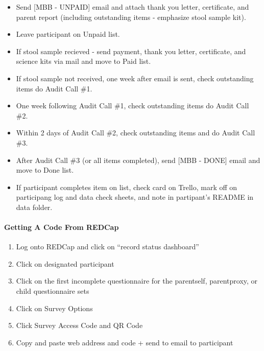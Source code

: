 \documentclass[]{book}
\providecommand{\tightlist}{%
  \setlength{\itemsep}{0pt}\setlength{\parskip}{0pt}}
\let\oldparagraph\paragraph
\renewcommand{\paragraph}[1]{\oldparagraph{#1}\mbox{}}
\begin{document}
\begin{itemize}
\tightlist
\item
  Send {[}MBB - UNPAID{]} email and attach thank you letter, certificate, and parent report (including outstanding items - emphasize stool sample kit).
\item
  Leave participant on Unpaid list.
\item
  If stool sample recieved - send payment, thank you letter, certificate, and science kits via mail and move to Paid list.
\item
  If stool sample not received, one week after email is sent, check outstanding items do Audit Call \#1.
\item
  One week following Audit Call \#1, check outstanding items do Audit Call \#2.
\item
  Within 2 days of Audit Call \#2, check outstanding items and do Audit Call \#3.
\item
  After Audit Call \#3 (or all items completed), send {[}MBB - DONE{]} email and move to Done list.
\item
  If participant completes item on list, check card on Trello, mark off on participang log and data check sheets, and note in partipant's README in data folder.
\end{itemize}

\hypertarget{getting-a-code-from-redcap-1}{%
\paragraph{Getting A Code From REDCap}\label{getting-a-code-from-redcap-1}}

\begin{enumerate}
\def\labelenumi{\arabic{enumi}.}
\tightlist
\item
  Log onto REDCap and click on ``record status dashboard''\\
\item
  Click on designated participant\\
\item
  Click on the first incomplete questionnaire for the parentself, parentproxy, or child questionnaire sets\\
\item
  Click on Survey Options\\
\item
  Click Survey Access Code and QR Code\\
\item
  Copy and paste web address and code + send to email to participant
\end{enumerate}
\end{document}
